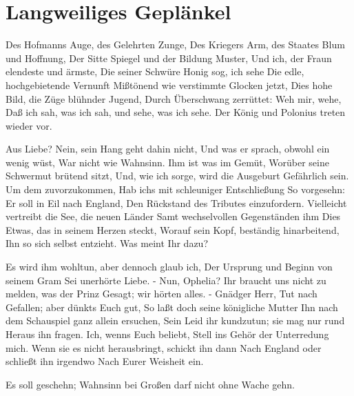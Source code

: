 \chapter{Langweiliges Geplänkel}

Des Hofmanns Auge, des Gelehrten Zunge,
Des Kriegers Arm, des Staates Blum und Hoffnung,
Der Sitte Spiegel und der Bildung Muster,
Und ich, der Fraun elendeste und ärmste,
Die seiner Schwüre Honig sog, ich sehe
Die edle, hochgebietende Vernunft
Mißtönend wie verstimmte Glocken jetzt,
Dies hohe Bild, die Züge blühnder Jugend,
Durch Überschwang zerrüttet: Weh mir, wehe,
Daß ich sah, was ich sah, und sehe, was ich sehe.
Der König und Polonius treten wieder vor.

Aus Liebe? Nein, sein Hang geht dahin nicht,
Und was er sprach, obwohl ein wenig wüst,
War nicht wie Wahnsinn. Ihm ist was im Gemüt,
Worüber seine Schwermut brütend sitzt,
Und, wie ich sorge, wird die Ausgeburt
Gefährlich sein. Um dem zuvorzukommen,
Hab ichs mit schleuniger Entschließung
So vorgesehn: Er soll in Eil nach England,
Den Rückstand des Tributes einzufordern.
Vielleicht vertreibt die See, die neuen Länder
Samt wechselvollen Gegenständen ihm
Dies Etwas, das in seinem Herzen steckt,
Worauf sein Kopf, beständig hinarbeitend,
Ihn so sich selbst entzieht. Was meint Ihr dazu?

Es wird ihm wohltun, aber dennoch glaub ich,
Der Ursprung und Beginn von seinem Gram
Sei unerhörte Liebe. - Nun, Ophelia?
Ihr braucht uns nicht zu melden, was der Prinz
Gesagt; wir hörten alles. - Gnädger Herr,
Tut nach Gefallen; aber dünkts Euch gut,
So laßt doch seine königliche Mutter
Ihn nach dem Schauspiel ganz allein ersuchen,
Sein Leid ihr kundzutun; sie mag nur rund
Heraus ihn fragen. Ich, wenns Euch beliebt,
Stell ins Gehör der Unterredung mich.
Wenn sie es nicht herausbringt, schickt ihn dann
Nach England oder schließt ihn irgendwo
Nach Eurer Weisheit ein.

Es soll geschehn;
Wahnsinn bei Großen darf nicht ohne Wache gehn.
